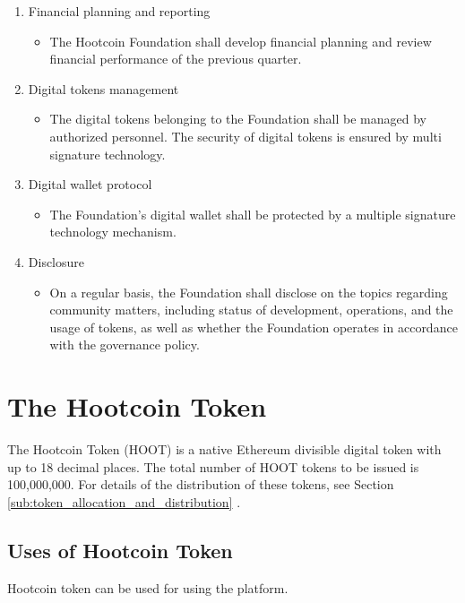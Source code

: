 \documentclass{article}
\begin{document}
\begin{enumerate}
  \item Financial planning and reporting
  \begin{itemize}
    \item The Hootcoin Foundation shall develop financial planning and review financial
performance of the previous quarter.
  \end{itemize}

  \item Digital tokens management
    \begin{itemize}
    \item The digital tokens belonging to the Foundation shall be managed by authorized personnel. The security of digital tokens is ensured by multi signature technology.
  \end{itemize}

  \item Digital wallet protocol
    \begin{itemize}
    \item The Foundation’s digital wallet shall be protected by a multiple signature technology mechanism.
  \end{itemize}

  \item Disclosure
    \begin{itemize}
    \item On a regular basis, the Foundation shall disclose on the topics regarding community matters, including status of development, operations, and the usage of tokens, as well as whether the Foundation operates in accordance with the governance policy.
  \end{itemize}
\end{enumerate}


\section{The Hootcoin Token}
The Hootcoin Token (HOOT) is a native Ethereum divisible digital token with up to 18 decimal places. The total number of HOOT tokens to be issued is 100,000,000. For details of the distribution of these tokens, see Section \ref{sub:token_allocation_and_distribution} .

\subsection{Uses of Hootcoin Token} %
\label{sub:uses_of_hoot_token}
Hootcoin token can be used for using the platform.
\end{document}
